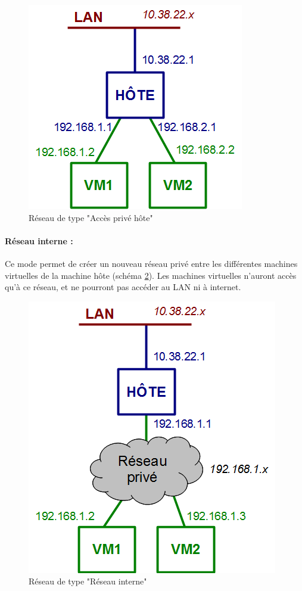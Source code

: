 \begin{figure}[H]
	\center
	\includegraphics[scale=0.5]{img/types_reseau/Acces_prive_hote.png}
	\caption{Réseau de type "Accès privé hôte"}
	\label{Schéma Accès privé hôte}
\end{figure}


\paragraph{Réseau interne :}

Ce mode permet de créer un nouveau réseau privé entre les différentes machines virtuelles de la machine hôte (schéma \ref{Schéma Réseau interne}).
Les machines virtuelles n'auront accès qu'à ce réseau, et ne pourront pas accéder au LAN ni à internet.

\begin{figure}[H]
	\center
	\includegraphics[scale=0.5]{img/types_reseau/Reseau_interne.png}
	\caption{Réseau de type "Réseau interne"}
	\label{Schéma Réseau interne}
\end{figure}



